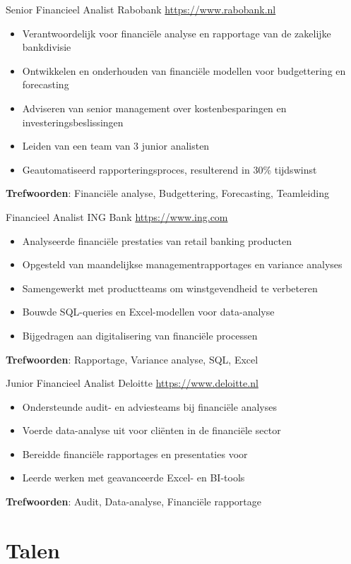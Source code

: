 \documentclass[a4paper, serif, 10pt]{moderncv}
\begin{document}
        {Senior Financieel Analist}
        {Rabobank}
        {\url{https://www.rabobank.nl}}
        {}
        {\begin{itemize}
\item Verantwoordelijk voor financiële analyse en rapportage van de zakelijke bankdivisie
\item Ontwikkelen en onderhouden van financiële modellen voor budgettering en forecasting
\item Adviseren van senior management over kostenbesparingen en investeringsbeslissingen
\item Leiden van een team van 3 junior analisten
\item Geautomatiseerd rapporteringsproces, resulterend in 30\% tijdswinst
\end{itemize}
\textbf{Trefwoorden}: Financiële analyse, Budgettering, Forecasting, Teamleiding}

        {Financieel Analist}
        {ING Bank}
        {\url{https://www.ing.com}}
        {}
        {\begin{itemize}
\item Analyseerde financiële prestaties van retail banking producten
\item Opgesteld van maandelijkse managementrapportages en variance analyses
\item Samengewerkt met productteams om winstgevendheid te verbeteren
\item Bouwde SQL-queries en Excel-modellen voor data-analyse
\item Bijgedragen aan digitalisering van financiële processen
\end{itemize}
\textbf{Trefwoorden}: Rapportage, Variance analyse, SQL, Excel}

        {Junior Financieel Analist}
        {Deloitte}
        {\url{https://www.deloitte.nl}}
        {}
        {\begin{itemize}
\item Ondersteunde audit- en adviesteams bij financiële analyses
\item Voerde data-analyse uit voor cliënten in de financiële sector
\item Bereidde financiële rapportages en presentaties voor
\item Leerde werken met geavanceerde Excel- en BI-tools
\end{itemize}
\textbf{Trefwoorden}: Audit, Data-analyse, Financiële rapportage}
\section{Talen}
\end{document}
